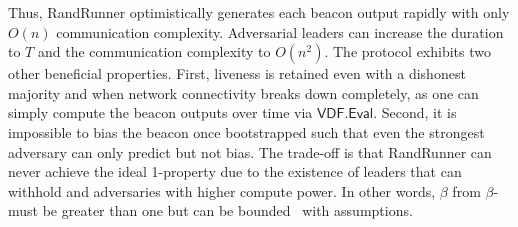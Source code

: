 
Thus, RandRunner optimistically generates each beacon output rapidly with only $O(n)$ communication complexity. Adversarial leaders can increase the \epoch duration to $T$ and the communication complexity to $O(n^2)$. The protocol exhibits two other beneficial properties. First, liveness is retained even with a dishonest majority and when network connectivity breaks down completely, as one can simply compute the beacon outputs over time via $\mathsf{VDF.Eval}$. Second, it is impossible to bias the beacon once bootstrapped such that even the strongest adversary can only predict but not bias. The trade-off is that RandRunner can never achieve the ideal 1-\interunpredictability property due to the existence of leaders that can withhold and adversaries with higher compute power. In other words, $\beta$ from $\beta$-\interunpredictability must be greater than one but can be bounded~\cite{schindler2021randrunner} with assumptions.
